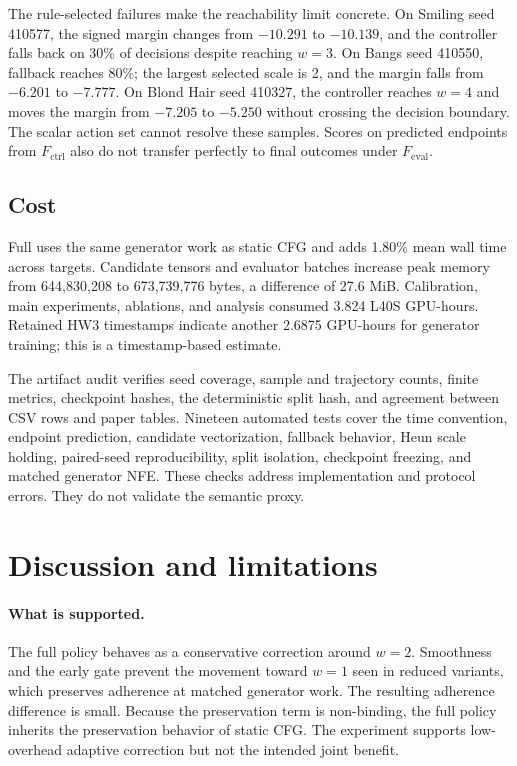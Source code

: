 \documentclass[10pt,twocolumn,letterpaper]{article}
\begin{document}
The rule-selected failures make the reachability limit concrete. On Smiling
seed 410577, the signed margin changes from $-10.291$ to $-10.139$, and the
controller falls back on 30\% of decisions despite reaching $w=3$. On Bangs
seed 410550, fallback reaches 80\%; the largest selected scale is 2, and the
margin falls from $-6.201$ to $-7.777$. On Blond Hair seed 410327, the
controller reaches $w=4$ and moves the margin from $-7.205$ to $-5.250$ without
crossing the decision boundary. The scalar action set cannot resolve these
samples. Scores on predicted endpoints from $F_{\mathrm{ctrl}}$ also do not
transfer perfectly to final outcomes under $F_{\mathrm{eval}}$.

\subsection{Cost}

Full \method uses the same generator work as static CFG and adds 1.80\% mean
wall time across targets. Candidate tensors and evaluator batches increase
peak memory from 644,830,208 to 673,739,776 bytes, a difference of 27.6 MiB.
Calibration, main experiments, ablations, and analysis consumed 3.824 L40S
GPU-hours. Retained HW3 timestamps indicate another 2.6875 GPU-hours for
generator training; this is a timestamp-based estimate.

The artifact audit verifies seed coverage, sample and trajectory counts, finite
metrics, checkpoint hashes, the deterministic split hash, and agreement between
CSV rows and paper tables. Nineteen automated tests cover the time convention,
endpoint prediction, candidate vectorization, fallback behavior, Heun scale
holding, paired-seed reproducibility, split isolation, checkpoint freezing,
and matched generator NFE. These checks address implementation and protocol
errors. They do not validate the semantic proxy.

\section{Discussion and limitations}
\label{sec:discussion}

\paragraph{What is supported.}
The full policy behaves as a conservative correction around $w=2$. Smoothness
and the early gate prevent the movement toward $w=1$ seen in reduced variants,
which preserves adherence at matched generator work. The resulting adherence
difference is small. Because the preservation term is non-binding, the full
policy inherits the preservation behavior of static CFG. The experiment
supports low-overhead adaptive correction but not the intended joint benefit.
\end{document}
